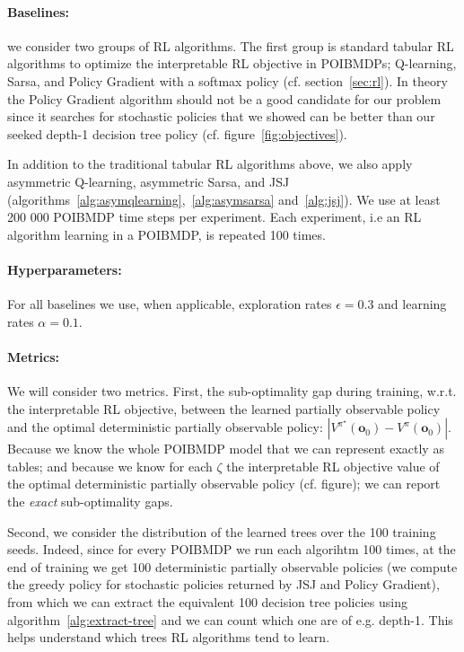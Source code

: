 \paragraph{Baselines:} we consider two groups of RL algorithms.
The first group is standard tabular RL algorithms to optimize the interpretable RL objective in POIBMDPs; Q-learning, Sarsa, and Policy Gradient with a softmax policy (cf. section~\ref{sec:rl}).
In theory the Policy Gradient algorithm should not be a good candidate for our problem since it searches for stochastic policies that we showed can be better than our seeked depth-1 decision tree policy (cf. figure~\ref{fig:objectives}).

In addition to the traditional tabular RL algorithms above, we also apply asymmetric Q-learning, asymmetric Sarsa, and JSJ (algorithms~\ref{alg:asymqlearning},~\ref{alg:asymsarsa} and~\ref{alg:jsj}).
We use at least 200 000 POIBMDP time steps per experiment. Each experiment, i.e an RL algorithm learning in a POIBMDP, is repeated 100 times.  

\paragraph{Hyperparameters:} For all baselines we use, when applicable, exploration rates $\epsilon=0.3$ and learning rates $\alpha=0.1$.

\paragraph{Metrics:} We will consider two metrics.
First, the sub-optimality gap during training, w.r.t. the interpretable RL objective, between the learned partially observable policy and the optimal deterministic partially observable policy: $|V^\pi^{\star}(\boldsymbol{o}_0) - V^\pi(\boldsymbol{o}_0)|$.
Because we know the whole POIBMDP model that we can represent exactly as tables; and because we know for each $\zeta$ the interpretable RL objective value of the optimal deterministic partially observable policy (cf. figure); we can report the \textit{exact} sub-optimality gaps.

Second, we consider the distribution of the learned trees over the 100 training seeds.
Indeed, since for every POIBMDP we run each algorihtm 100 times, at the end of training we get 100 deterministic partially observable policies (we compute the greedy policy for stochastic policies returned by JSJ and Policy Gradient), from which we can extract the equivalent 100 decision tree policies using algorithm~\ref{alg:extract-tree} and we can count which one are of e.g. depth-1.
This helps understand which trees RL algorithms tend to learn.

